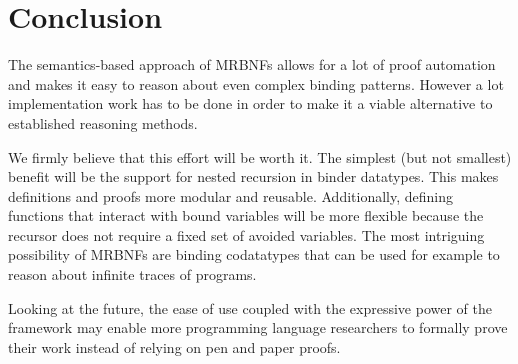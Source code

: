 \chapter{Conclusion}

The semantics-based approach of \acp{MRBNF} allows for a lot of proof automation and makes it easy to reason about even complex binding patterns. However a lot implementation work has to be done in order to make it a viable alternative to established reasoning methods.

We firmly believe that this effort will be worth it. The simplest (but not smallest) benefit will be the support for nested recursion in binder datatypes. This makes definitions and proofs more modular and reusable. Additionally, defining functions that interact with bound variables will be more flexible because the recursor does not require a fixed set of avoided variables. The most intriguing possibility of \acp{MRBNF} are binding codatatypes that can be used for example to reason about infinite traces of programs.

Looking at the future, the ease of use coupled with the expressive power of the framework may enable more programming language researchers to formally prove their work instead of relying on pen and paper proofs.

